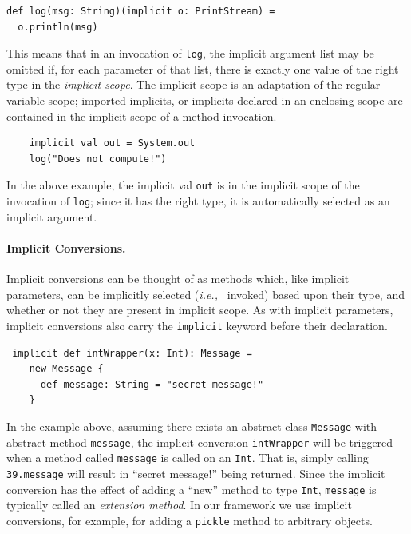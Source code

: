 \documentclass[preprint,10pt]{sigplanconf}
\theoremstyle{definition}
\theoremstyle{definition}
\newcommand{\todo}{{\bf \colorbox{red}{\color{white}TODO:}}}
\newcommand{\ie}{{\em i.e.,~}}
\newcommand{\term}[1]{\mbox{\texttt{#1}}}
\begin{document}
\begin{lstlisting}
def log(msg: String)(implicit o: PrintStream) =
  o.println(msg)
\end{lstlisting}

This means that in an invocation of \term{log}, the implicit argument list may
be omitted if, for each parameter of that list, there is exactly one value of
the right type in the {\em implicit scope}. The implicit scope is an
adaptation of the regular variable scope; imported implicits, or implicits
declared in an enclosing scope are contained in the implicit scope of a method
invocation.

\begin{lstlisting}
    implicit val out = System.out
    log("Does not compute!")
\end{lstlisting}

In the above example, the implicit val \term{out} is in the implicit scope of
the invocation of \term{log}; since it has the right type, it is automatically
selected as an implicit argument.



\paragraph{Implicit Conversions.} Implicit conversions can be thought of as
methods which, like implicit parameters, can be implicitly selected (\ie
invoked) based upon their type, and whether or not they are present in
implicit scope. As with implicit parameters, implicit conversions also carry
the \term{implicit} keyword before their declaration.

\begin{lstlisting}
 implicit def intWrapper(x: Int): Message =
    new Message {
      def message: String = "secret message!"
    }
\end{lstlisting}

In the example above, assuming there exists an abstract class \term{Message}
with abstract method \term{message}, the implicit conversion
\term{intWrapper} will be triggered when a method called \term{message}
is called on an \term{Int}. That is, simply calling
\term{39.message} will result in ``secret message!'' being
returned. Since the implicit conversion has the effect of adding a
``new'' method to type \term{Int}, \term{message} is typically called an
{\em extension method}. In our framework we use implicit conversions,
for example, for adding a \term{pickle} method to arbitrary objects.
\end{document}
